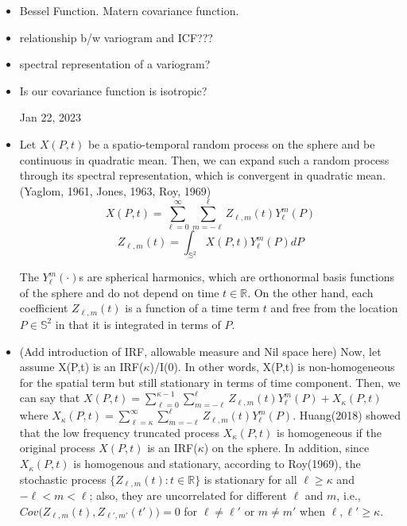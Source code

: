 \documentclass[11pt]{article}
\begin{document}
\begin{itemize}
\item Bessel Function. Matern covariance function.\\

\item relationship b/w variogram and ICF???\\

\item spectral representation of a variogram?\\

\item Is our covariance function is isotropic?\ 

\pagebreak


Jan 22, 2023\\

\item
Let $X(P,t)$ be a spatio-temporal random process on the sphere and be continuous in quadratic mean. Then, we can expand such a random process through its spectral representation, which is convergent in quadratic mean.(Yaglom, 1961, Jones, 1963, Roy, 1969)\\
$$ X(P,t)= \sum_{\ell=0}^{\infty}\sum_{m=-\ell}^{\ell}Z_{\ell,m}(t)Y_\ell^m(P)$$
$$Z_{\ell,m}(t)=\int_{\mathbb{S}^2} X(P,t)Y_\ell^m(P)dP$$

The $Y_\ell^m(\cdot)$s are spherical harmonics, which are orthonormal basis functions of the sphere and do not depend on time $t \in \mathbb{R}$. On the other hand, each coefficient $Z_{\ell,m}(t)$ is a function of a time term $t$ and free from the location $P \in \mathbb{S}^2$ in that it is integrated in terms of $P$. \\

\item {\color{red}(Add introduction of IRF, allowable measure and Nil space here)} Now, let assume X(P,t) is an IRF($\kappa$)/I(0). In other words, X(P,t) is non-homogeneous for the spatial term but still stationary in terms of time component. Then, we can say that $X(P,t) = \sum_{\ell=0}^{\kappa-1} \sum_{m=-\ell}^{\ell}Z_{\ell,m}(t)Y_\ell^m(P) + X_\kappa(P,t)$ where $X_\kappa(P,t) =  \sum_{\ell=\kappa}^{\infty} \sum_{m=-\ell}^{\ell} Z_{\ell,m}(t) Y_{\ell}^{m}(P).$ Huang(2018) showed that the low frequency truncated process $X_\kappa(P,t)$ is homogeneous if the original process $X(P,t)$ is an IRF($\kappa$) on the sphere. In addition, since $X_{\kappa}(P,t)$ is homogenous and stationary, according to Roy(1969), the stochastic process $\{Z_{\ell,m}(t) : t \in \mathbb{R} \}$ is stationary for all $\ell \ge \kappa$ and $-\ell < m < \ell$; also, they are uncorrelated for different $\ell$ and $m$, i.e., $Cov\biggl(Z_{\ell,m}(t), Z_{\ell',m'}(t')\biggl)=0$ for $\ell \ne \ell'$ or $m \ne m'$ when $\ell, \ell' \ge \kappa$.\\


\end{itemize}
\end{document}
